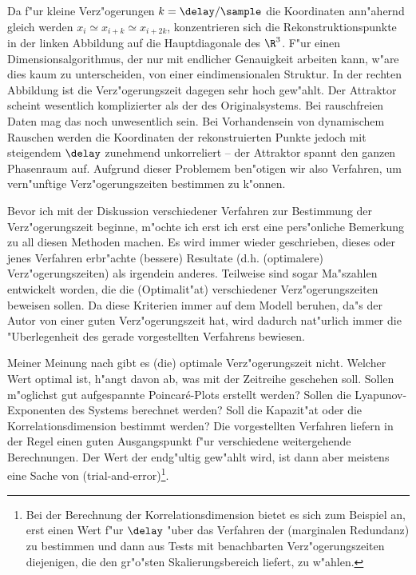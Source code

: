 Da f"ur kleine Verz"ogerungen $k=\delay/\sample$ die Koordinaten ann"ahernd gleich werden
$x_i\simeq x_{i+k}\simeq x_{i+2k}$, konzentrieren sich die Rekonstruktionspunkte in der
linken Abbildung auf die Hauptdiagonale des $\R^3$. F"ur einen Dimensionsalgorithmus, der
nur mit endlicher Genauigkeit arbeiten kann, w"are dies kaum zu unterscheiden, von einer
eindimensionalen Struktur. In der rechten Abbildung ist die Verz"ogerungszeit dagegen sehr
hoch gew"ahlt.  Der Attraktor scheint wesentlich komplizierter als der des
Originalsystems. Bei rauschfreien Daten mag das noch unwesentlich sein. Bei Vorhandensein
von dynamischem Rauschen werden die Koordinaten der rekonstruierten Punkte jedoch mit
steigendem $\delay$ zunehmend unkorreliert -- der Attraktor spannt den ganzen Phasenraum
auf. Aufgrund dieser Problemem ben"otigen wir also Verfahren, um vern"unftige
Verz"ogerungszeiten bestimmen zu k"onnen.

Bevor ich mit der Diskussion verschiedener Verfahren zur Bestimmung der Verz"ogerungszeit
beginne, m"ochte ich erst ich erst eine pers"onliche Bemerkung zu all diesen Methoden
machen. Es wird immer wieder geschrieben, dieses oder jenes Verfahren erbr"achte
\slang(bessere) Resultate (d.h. \slang(optimalere) Verz"ogerungszeiten) als irgendein
anderes. Teilweise sind sogar Ma"szahlen entwickelt worden, die die \slang(Optimalit"at)
verschiedener Verz"ogerungszeiten beweisen sollen. Da diese Kriterien immer auf dem Modell
beruhen, da"s der Autor von einer guten Verz"ogerungszeit hat, wird dadurch nat"urlich
immer die "Uberlegenheit des gerade vorgestellten Verfahrens bewiesen.

Meiner Meinung nach gibt es \slang(die) optimale Verz"ogerungszeit nicht. Welcher Wert
optimal ist, h"angt davon ab, was mit der Zeitreihe geschehen soll. Sollen m"oglichst gut
aufgespannte Poincar\'e-Plots erstellt werden? Sollen die Lyapunov-Exponenten des Systems
berechnet werden? Soll die Kapazit"at oder die Korrelationsdimension bestimmt werden? Die
vorgestellten Verfahren liefern in der Regel einen guten Ausgangspunkt f"ur verschiedene
weitergehende Berechnungen. Der Wert der endg"ultig gew"ahlt wird, ist dann aber meistens
eine Sache von \metapher(trial-and-error)\footnote{Bei der Berechnung der
  Korrelationsdimension bietet es sich zum Beispiel an, erst einen Wert f"ur $\delay$
  "uber das Verfahren der \begriff(marginalen Redundanz) zu bestimmen und dann aus Tests
  mit benachbarten Verz"ogerungszeiten diejenigen, die den gr"o"sten Skalierungsbereich
  liefert, zu w"ahlen.}.

